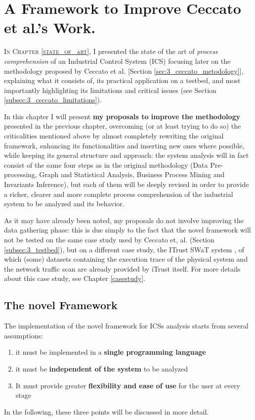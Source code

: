 \chapter{A Framework to Improve Ceccato et al.’s Work.}
\label{chap:proposal}

\linenumbers
\lettrine[lines=2]{I}{n Chapter \ref{state_of_art}}, I presented the state of the art of \textit{process comprehension} of an Industrial Control System (ICS) focusing later on the methodology proposed by Ceccato et al. \cite{ceccato}[Section \ref{sec:3_ceccato_metodology}], explaining what it consists of, its practical application on a testbed, and most importantly highlighting its limitations and critical issues (see Section \ref{subsec:3_ceccato_limitations}).

\bigskip
In this chapter I will present \textbf{my proposals to improve the methodology} presented in the previous chapter, overcoming (or at least trying to do so) the criticalities mentioned above by almost completely rewriting the original framework, enhancing its functionalities and inserting new ones where possible, while keeping its general structure and approach: the system analysis will in fact consist of the same four steps as in the original methodology (Data Pre-processing, Graph and Statistical Analysis, Business Process Mining and Invariants Inference), but each of them will be deeply revised in order to provide a richer, clearer and more complete process comprehension of the industrial system to be analyzed and its behavior.

\bigskip
As it may have already been noted, my proposals do not involve improving the data gathering phase: this is due simply to the fact that the novel framework will not be tested on the same case study used by Ceccato et, al. (Section \ref{subsec:3_testbed}), but on a different case study, the ITrust SWaT system \cite{swat_home}, of which (some) datasets containing the execution trace of the physical system and the network traffic scan are already provided by iTrust itself. For more details about this case study, see Chapter \ref{casestudy}.

\section{The novel Framework}
\label{sec:4_framework_presentation}
The implementation of the novel framework for ICSs analysis starts from several assumptions:

\begin{enumerate}
	\item it must be implemented in a \textbf{single programming language}
	\item it must be \textbf{independent of the system} to be analyzed
	\item It must provide greater \textbf{flexibility and ease of use} for the user at every stage
\end{enumerate}
In the following, these three points will be discussed in more detail.

